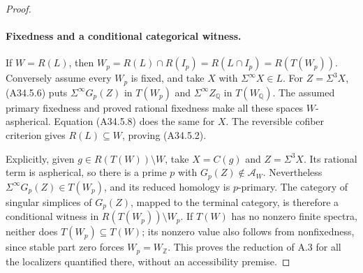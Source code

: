 \begin{proof}
\paragraph{Fixedness and a conditional categorical witness.}
If $W=R(L)$, then
$W_p=R(L)\cap R(I_p)=R(L\cap I_p)=R(T(W_p))$.
Conversely assume every $W_p$ is fixed, and take $X$ with
$\Sigma^\infty X\in L$.  For $Z=\Sigma^3X$,
\textup{(A34.5.6)} puts $\Sigma^\infty G_p(Z)$ in $T(W_p)$
and $\Sigma^\infty Z_{\mathbb Q}$ in $T(W_{\mathbb Q})$.
The assumed primary fixedness and proved rational fixedness make
all these spaces $W$-aspherical.  Equation \textup{(A34.5.8)}
does the same for $X$.  The reversible cofiber criterion gives
$R(L)\subseteq W$, proving \textup{(A34.5.2)}.

Explicitly, given $g\in R(T(W))\setminus W$, take $X=C(g)$
and $Z=\Sigma^3X$.  Its rational term is aspherical, so there
is a prime $p$ with $G_p(Z)\notin\mathcal A_W$.  Nevertheless
$\Sigma^\infty G_p(Z)\in T(W_p)$, and its reduced homology
is $p$-primary.  The category of singular simplices of $G_p(Z)$,
mapped to the terminal category, is therefore a conditional witness
in $R(T(W_p))\setminus W_p$.  If $T(W)$ has no nonzero finite
spectra, neither does $T(W_p)\subseteq T(W)$; its nonzero value
also follows from nonfixedness, since stable part zero forces
$W_p=W_{\mathbb Z}$.  This proves the reduction of A.3 for all
the localizers quantified there, without an accessibility premise.
\end{proof}


